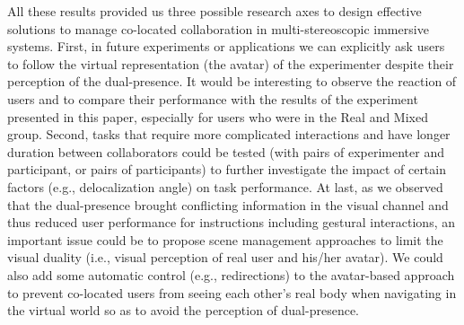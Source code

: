 All these results provided us three possible research axes to design effective solutions to manage co-located collaboration in multi-stereoscopic immersive systems. First, in future experiments or applications we can explicitly ask users to follow the virtual representation (the avatar) of the experimenter despite their perception of the dual-presence. It would be interesting to observe the reaction of users and to compare their performance with the results of the experiment presented in this paper, especially for users who were in the Real and Mixed group. Second, tasks that require more complicated interactions and have longer duration between collaborators could be tested (with pairs of experimenter and participant, or pairs of participants) to further investigate the impact of certain factors (e.g., delocalization angle) on task performance. At last, as we observed that the dual-presence brought conflicting information in the visual channel and thus reduced user performance for instructions including gestural interactions, an important issue could be to propose scene management approaches to limit the visual duality (i.e., visual perception of real user and his/her avatar). We could also add some automatic control (e.g., redirections) to the avatar-based approach to prevent co-located users from seeing each other's real body when navigating in the virtual world so as to avoid the perception of dual-presence.
